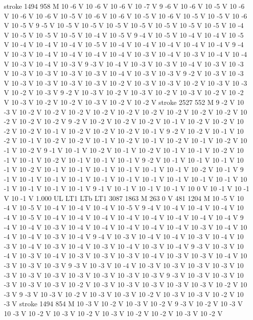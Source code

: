 {{stroke
1494 958 M
10 -6 V
10 -6 V
10 -6 V
10 -7 V
9 -6 V
10 -6 V
10 -5 V
10 -6 V
10 -6 V
10 -6 V
10 -5 V
10 -6 V
10 -6 V
10 -5 V
10 -6 V
10 -5 V
10 -5 V
10 -6 V
10 -5 V
9 -5 V
10 -5 V
10 -5 V
10 -5 V
10 -5 V
10 -5 V
10 -5 V
10 -5 V
10 -4 V
10 -5 V
10 -5 V
10 -5 V
10 -4 V
10 -5 V
9 -4 V
10 -5 V
10 -4 V
10 -4 V
10 -5 V
10 -4 V
10 -4 V
10 -4 V
10 -5 V
10 -4 V
10 -4 V
10 -4 V
10 -4 V
10 -4 V
9 -4 V
10 -3 V
10 -4 V
10 -4 V
10 -4 V
10 -4 V
10 -3 V
10 -4 V
10 -3 V
10 -4 V
10 -4 V
10 -3 V
10 -4 V
10 -3 V
9 -3 V
10 -4 V
10 -3 V
10 -3 V
10 -4 V
10 -3 V
10 -3 V
10 -3 V
10 -3 V
10 -3 V
10 -3 V
10 -4 V
10 -3 V
10 -3 V
9 -2 V
10 -3 V
10 -3 V
10 -3 V
10 -3 V
10 -3 V
10 -3 V
10 -2 V
10 -3 V
10 -3 V
10 -2 V
10 -3 V
10 -3 V
10 -2 V
10 -3 V
9 -2 V
10 -3 V
10 -2 V
10 -3 V
10 -2 V
10 -3 V
10 -2 V
10 -2 V
10 -3 V
10 -2 V
10 -2 V
10 -3 V
10 -2 V
10 -2 V
stroke
2527 552 M
9 -2 V
10 -3 V
10 -2 V
10 -2 V
10 -2 V
10 -2 V
10 -2 V
10 -2 V
10 -2 V
10 -2 V
10 -2 V
10 -2 V
10 -2 V
10 -2 V
9 -2 V
10 -2 V
10 -2 V
10 -2 V
10 -1 V
10 -2 V
10 -2 V
10 -2 V
10 -2 V
10 -1 V
10 -2 V
10 -2 V
10 -2 V
10 -1 V
9 -2 V
10 -2 V
10 -1 V
10 -2 V
10 -1 V
10 -2 V
10 -2 V
10 -1 V
10 -2 V
10 -1 V
10 -2 V
10 -1 V
10 -2 V
10 -1 V
10 -2 V
9 -1 V
10 -1 V
10 -2 V
10 -1 V
10 -2 V
10 -1 V
10 -1 V
10 -2 V
10 -1 V
10 -1 V
10 -2 V
10 -1 V
10 -1 V
10 -1 V
9 -2 V
10 -1 V
10 -1 V
10 -1 V
10 -1 V
10 -2 V
10 -1 V
10 -1 V
10 -1 V
10 -1 V
10 -1 V
10 -1 V
10 -2 V
10 -1 V
9 -1 V
10 -1 V
10 -1 V
10 -1 V
10 -1 V
10 -1 V
10 -1 V
10 -1 V
10 -1 V
10 -1 V
10 -1 V
10 -1 V
10 -1 V
10 -1 V
9 -1 V
10 -1 V
10 -1 V
10 -1 V
10 0 V
10 -1 V
10 -1 V
10 -1 V
1.000 UL
LT1
LTb
LT1
3087 1863 M
263 0 V
481 1204 M
10 -5 V
10 -4 V
10 -5 V
10 -4 V
10 -4 V
10 -4 V
10 -5 V
9 -4 V
10 -4 V
10 -4 V
10 -4 V
10 -4 V
10 -5 V
10 -4 V
10 -4 V
10 -4 V
10 -4 V
10 -4 V
10 -4 V
10 -4 V
10 -4 V
9 -4 V
10 -4 V
10 -3 V
10 -4 V
10 -4 V
10 -4 V
10 -4 V
10 -4 V
10 -3 V
10 -4 V
10 -4 V
10 -4 V
10 -3 V
10 -4 V
9 -4 V
10 -3 V
10 -4 V
10 -4 V
10 -3 V
10 -4 V
10 -3 V
10 -4 V
10 -3 V
10 -4 V
10 -3 V
10 -4 V
10 -3 V
10 -4 V
9 -3 V
10 -3 V
10 -4 V
10 -3 V
10 -4 V
10 -3 V
10 -3 V
10 -3 V
10 -4 V
10 -3 V
10 -3 V
10 -4 V
10 -3 V
10 -3 V
10 -3 V
9 -3 V
10 -3 V
10 -4 V
10 -3 V
10 -3 V
10 -3 V
10 -3 V
10 -3 V
10 -3 V
10 -3 V
10 -3 V
10 -3 V
10 -3 V
10 -3 V
9 -3 V
10 -3 V
10 -3 V
10 -3 V
10 -3 V
10 -3 V
10 -2 V
10 -3 V
10 -3 V
10 -3 V
10 -3 V
10 -3 V
10 -2 V
10 -3 V
9 -3 V
10 -3 V
10 -2 V
10 -3 V
10 -3 V
10 -2 V
10 -3 V
10 -3 V
10 -2 V
10 -3 V
stroke
1494 854 M
10 -3 V
10 -2 V
10 -3 V
10 -2 V
9 -3 V
10 -2 V
10 -3 V
10 -3 V
10 -2 V
10 -3 V
10 -2 V
10 -3 V
10 -2 V
10 -2 V
10 -3 V
10 -2 V
}}

